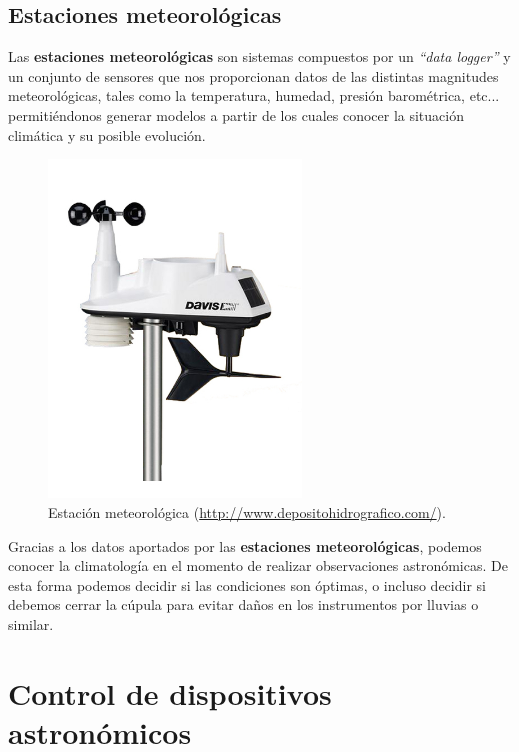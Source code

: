 \subsection{Estaciones meteorológicas}

Las \textbf{estaciones meteorológicas} son sistemas compuestos por un \textit{``data logger''} y un conjunto de sensores que nos proporcionan datos de las distintas magnitudes meteorológicas, tales como la temperatura, humedad, presión barométrica, etc... permitiéndonos generar modelos a partir de los cuales conocer la situación climática y su posible evolución. 

\bigskip
\begin{figure}[!ht]
  \begin{center}
  \includegraphics[width=0.6\textwidth]{../images/estacion.jpg}
  \caption[Estación meteorológica]{Estación meteorológica (\href{http://www.depositohidrografico.com/}{http://www.depositohidrografico.com/}).}
  \label{fig:diag_scrum}
  \end{center}
\end{figure}


\bigskip
Gracias a los datos aportados por las \textbf{estaciones meteorológicas}, podemos conocer la climatología en el momento de realizar observaciones astronómicas. De esta forma podemos decidir si las condiciones son óptimas, o incluso decidir si debemos cerrar la cúpula para evitar daños en los instrumentos por lluvias o similar. 

\newpage
\section{Control de dispositivos astronómicos}

